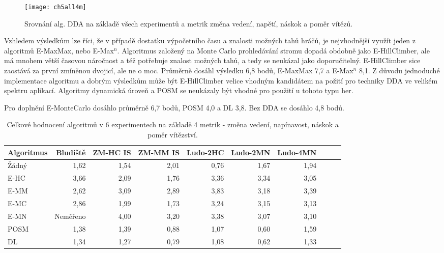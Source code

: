 \begin{figure}
  \centering
  \texttt{[image: ch5all4m]}
	\caption{ Srovnání alg. DDA na základě všech experimentů a metrik změna vedení, napětí, náskok a poměr vítězů. }
	\label{fig-ch5all4m}
\end{figure}

Vzhledem výsledkům lze říci, že v případě dostatku výpočetního času a znalosti možných tahů hráčů, je nejvhodnější využít jeden z algoritmů E-MaxMax, nebo E-Max$^n$. Algoritmus založený na Monte Carlo prohledávání stromu dopadá obdobně jako E-HillClimber, ale má mnohem větší časovou náročnost a též potřebuje znalost možných tahů, a tedy se neukázal jako doporučitelný. E-HillClimber sice zaostává za první zmíněnou dvojicí, ale ne o moc. Průměrně dosáhl výsledku 6,8 bodů, E-MaxMax 7,7 a E-Max$^n$ 8,1. Z důvodu jednoduché implementace algoritmu a dobrým výsledkům může být E-HillClimber velice vhodným kandidátem na požití pro techniky DDA ve velikém spektru aplikací. Algoritmy dynamická úroveň a POSM se neukázaly být vhodné pro použití u tohoto typu her.

Pro doplnění E-MonteCarlo dosáhlo průměrně 6,7 bodů, POSM 4,0 a DL 3,8. Bez DDA se dosáhlo 4,8 bodů.

\begin{table*}[b]\footnotesize
\vspace*{0mm}
\caption{{\label{tab-all4m}} Celkové hodnocení algoritmů v 6 experimentech na základě 4 metrik - změna vedení, napínavost, náskok a poměr vítězství.}
\vspace*{0mm}
\label{shadowtable}
\begin{center}
\begin{tabular}{| l || r | r | r | r | r | r | r | r | r |}
\hline
Algoritmus & Bludiště & ZM-HC IS & ZM-MM IS & Ludo-2HC & Ludo-2MN & Ludo-4MN \\
\hline
\hline
Žádný & 1,62 & 1,54 & 2,01 & 0,76 & 1,67 & 1,94\\ \hline  
E-HC & 3,66 & 2,09 & 1,76 & 3,36 & 3,34 & 3,05\\ \hline  
E-MM & 2,62 & 3,09 & 2,89 & 3,83 & 3,18 & 3,39\\ \hline  
E-MC & 2,86 & 1,99 & 1,73 & 3,24 & 3,15 & 3,13\\ \hline  
E-MN & Neměřeno & 4,00 & 3,20 & 3,38 & 3,07 & 3,10\\ \hline  
POSM & 1,38 & 1,39 & 0,88 & 1,07 & 0,60 & 1,59\\ \hline  
DL & 1,34 & 1,27 & 0,79 & 1,08 & 0,62 & 1,33 \\ \hline  
\end{tabular}
\end{center}
\end{table*}

\endinput
